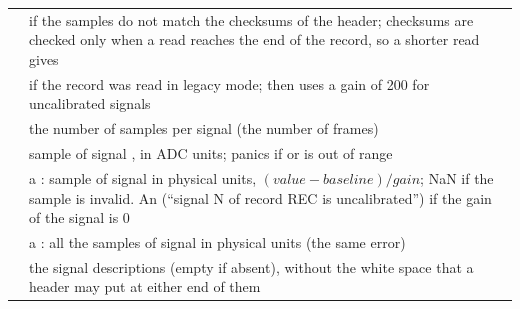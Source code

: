 \begin{xltabular}{\linewidth}{@{}lL@{}}
 &  if the samples do not match the checksums of the
  header; checksums are checked only when a read reaches the end of the record, so a
  shorter read gives  \\
 &  if the record was read in legacy mode;
   then uses a gain of 200 for uncalibrated signals \\
 & the number of samples per signal (the number of
  frames) \\
 & sample  of signal , in
  ADC units; panics if  or  is out of range \\
 & a : sample
   of signal  in physical units, $(\mathit{value} - \mathit{baseline}) /
  \mathit{gain}$; NaN if the sample is invalid. An  (``signal N of record REC
  is uncalibrated'') if the gain of the signal is 0 \\
 & a : all the
  samples of signal  in physical units (the same error) \\
 & the signal descriptions (empty if absent),
  without the white space that a header may put at either end of them \\
\end{xltabular}

